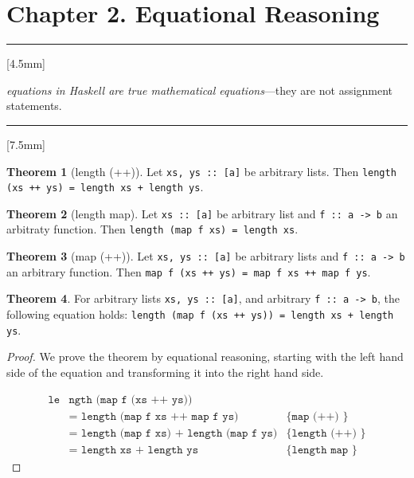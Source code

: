 \documentclass[11pt,a4paper]{article}
\theoremstyle{definition}
\newtheorem{thm}{Theorem}
\begin{document}
\section*{Chapter 2. Equational Reasoning}


\vspace{5mm}\rule{\textwidth}{0.1pt}\vspace{5mm}
[4.5mm]

\emph{equations in Haskell are true mathematical equations}---they are not 
assignment statements.


\vspace{5mm}\rule{\textwidth}{0.1pt}
[7.5mm]

\begin{thm}[length (++)]
  Let \texttt{xs, ys :: [a]} be arbitrary lists.
  Then \texttt{length (xs ++ ys) = length xs + length ys}.
\end{thm}

\begin{thm}[length map]
  Let \texttt{xs :: [a]} be arbitrary list and \texttt{f :: a -> b} an 
  arbitraty function. Then \texttt{length (map f xs) = length xs}.
\end{thm}

\begin{thm}[map (++)]
  Let \texttt{xs, ys :: [a]} be arbitrary lists and \texttt{f :: a -> b} an 
  arbitrary function. Then \texttt{map f (xs ++ ys) = map f xs ++ map f ys}.
\end{thm}

\begin{thm}
  For arbitrary lists \texttt{xs, ys :: [a]}, 
  and arbitrary \texttt{f :: a -> b},  the following equation holds: 
  \texttt{length (map f (xs ++ ys)) = length xs + length ys}.
\end{thm}

\begin{proof}
  We prove the theorem by equational reasoning, starting with the left hand side
  of the equation and transforming it into the right hand side.
  
  \begin{align*}
    \texttt{le}&\texttt{ngth (map f (xs ++ ys))}                           \\
      &\texttt{= length (map f xs ++ map f ys)}  & \texttt{\{ map (++) \}} \\
      &\texttt{= length (map f xs) + length (map f ys)}  & \texttt{\{ length (++) \}} \\
      &\texttt{= length xs + length ys}  & \texttt{\{ length map \}}
  \end{align*}
\end{proof}
\end{document}

